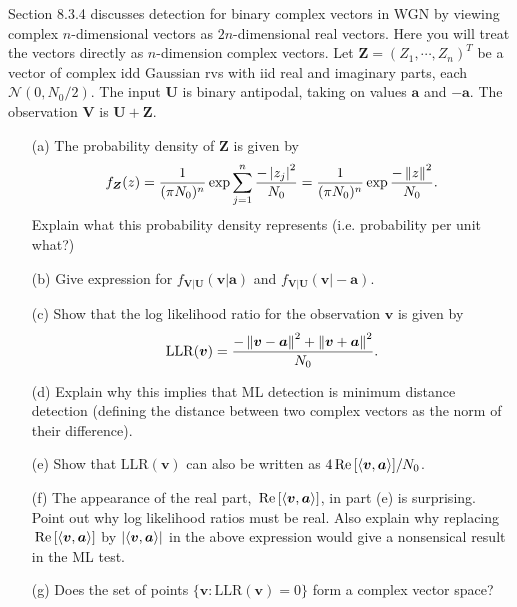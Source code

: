 \documentclass{assignment}
\begin{document}
\begin{prob}[8.11]
    Section 8.3.4 discusses detection for binary complex vectors in WGN by viewing complex $n$-dimensional vectors as $2n$-dimensional real vectors. Here you will treat the vectors directly as $n$-dimension complex vectors. Let $\bm{Z}=(Z_1,\cdots,Z_n)^T$ be a vector of complex idd Gaussian rvs with iid real and imaginary parts, each $\mathcal{N}(0,N_0/2)$. The input $\bm{U}$ is binary antipodal, taking on values $\bm{a}$ and $-\bm{a}$. The observation $\bm{V}$ is $\bm{U}+\bm{Z}$.
    \begin{itemize}
        \item[(a)] The probability density of $\bm{Z}$ is given by
        \[
            f_{\bm{Z}}(z)=\frac{1}{(\pi N_0)^n}\exp\sum_{j=1}^n\frac{-\left\lvert z_j\right\rvert^2}{N_0}=\frac{1}{(\pi N_0)^n}\exp\frac{-\left\lVert z\right\rVert^2}{N_0}.
        \]
        Explain what this probability density represents (i.e. probability per unit what?)
        \item[(b)] Give expression for $f_{\bm{V}\vert\bm{U}}(\bm{v}\vert\bm{a})$ and $f_{\bm{V}\vert\bm{U}}(\bm{v}\vert-\bm{a})$.
        \item[(c)] Show that the log likelihood ratio for the observation $\bm{v}$ is given by
        \[
            \mathrm{LLR}(\bm{v})=\frac{-\left\lVert\bm{v}-\bm{a}\right\rVert^2+\left\lVert\bm{v}+\bm{a}\right\rVert^2}{N_0}.
        \]
        \item[(d)] Explain why this implies that ML detection is minimum distance detection (defining the distance between two complex vectors as the norm of their difference).
        \item[(e)] Show that $\mathrm{LLR}(\bm{v})$ can also be written as $4\,\text{Re}\,[\langle\bm{v},\bm{a}\rangle]/N_0$.
        \item[(f)] The appearance of the real part, $\,\text{Re}\,[\langle\bm{v},\bm{a}\rangle]$, in part (e) is surprising. Point out why log likelihood ratios must be real. Also explain why replacing $\,\text{Re}\,[\langle\bm{v},\bm{a}\rangle]$ by $\left\lvert\langle\bm{v},\bm{a}\rangle\right\rvert$ in the above expression would give a nonsensical result in the ML test.
        \item[(g)] Does the set of points $\{\bm{v}:\text{LLR}(\bm{v})=0\}$ form a complex vector space?
    \end{itemize}
\end{prob}
\end{document}
